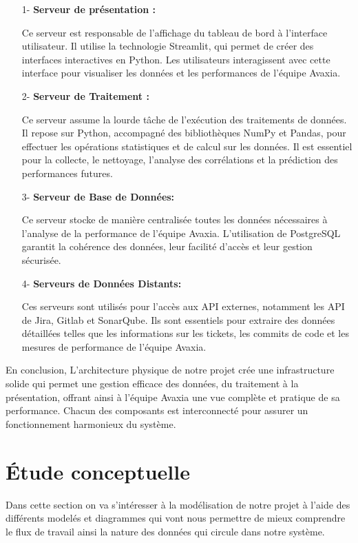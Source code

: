         \begin{enumerate}
            \item[1-] \textbf{Serveur de présentation : } 
            \par Ce serveur est responsable de l'affichage du tableau de bord à l'interface utilisateur. Il utilise la technologie Streamlit, qui permet de créer des interfaces interactives en Python. Les utilisateurs interagissent avec cette interface pour visualiser les données et les performances de l'équipe Avaxia.
            \item [2-] \textbf{Serveur de Traitement :} 
            \par Ce serveur assume la lourde tâche de l'exécution des traitements de données. Il repose sur Python, accompagné des bibliothèques NumPy et Pandas, pour effectuer les opérations statistiques et de calcul sur les données. Il est essentiel pour la collecte, le nettoyage, l'analyse des corrélations et la prédiction des performances futures.
            \item[3-]  \textbf{Serveur de Base de Données: }
            \par Ce serveur stocke de manière centralisée toutes les données nécessaires à l'analyse de la performance de l'équipe Avaxia. L'utilisation de PostgreSQL garantit la cohérence des données, leur facilité d'accès et leur gestion sécurisée.

            \item[4-] \textbf{Serveurs de Données Distants:}
            \par Ces serveurs sont utilisés pour l'accès aux API externes, notamment les API de Jira, Gitlab et SonarQube. Ils sont essentiels pour extraire des données détaillées telles que les informations sur les tickets, les commits de code et les mesures de performance de l'équipe Avaxia.
        \end{enumerate}
    \par En conclusion, L'architecture physique de notre projet crée une infrastructure solide qui permet une gestion efficace des données, du traitement à la présentation, offrant ainsi à l'équipe Avaxia une vue complète et pratique de sa performance. Chacun des composants est interconnecté pour assurer un fonctionnement harmonieux du système.

\section{Étude conceptuelle}
\par Dans cette section on va s'intéresser à la modélisation de notre projet à l'aide des différents modelés et diagrammes qui vont nous permettre de mieux comprendre le flux de travail ainsi la nature des données qui circule dans notre système.
